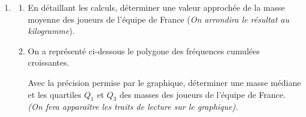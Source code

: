 \documentclass[12pt,french,oneside]{report}
\begin{document}
\begin{spacing}{1.2}
\begin{Exercice}[(10,5 points)]
\begin{enumerate}
\item 	\begin{enumerate}[label=\alph*)]
	\item En détaillant les calculs, déterminer une valeur approchée de la masse moyenne des joueurs de l'équipe de France (\textit{On arrondira le résultat au kilogramme}).
	
	\item On a représenté ci-dessous le polygone des fréquences cumulées croissantes. 
	
	Avec la précision permise par le graphique, déterminer une masse médiane et les quartiles $Q_1$ et $Q_3$ des masses des joueurs de l'équipe de France. \textit{(On fera apparaître les traits de lecture sur le graphique).}

	\end{enumerate}

\end{enumerate}

\begin{center}
\end{center}


\end{Exercice}
\end{spacing}
\end{document}
